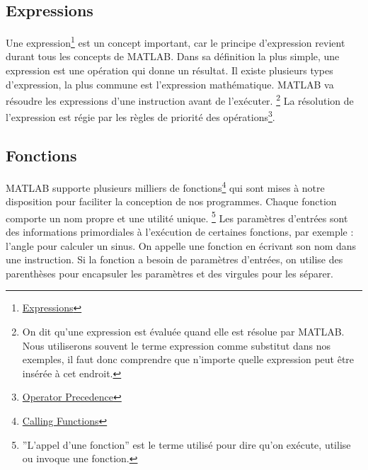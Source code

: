 \documentclass{tufte-handout}
\begin{document}
\subsection{Expressions}
Une expression\footnote{\href{https://www.mathworks.com/help/matlab/learn_matlab/expressions.html}{Expressions}} est un concept important, car le principe d'expression revient durant tous les concepts de MATLAB.
Dans sa définition la plus simple, une expression est une opération qui donne un résultat. Il existe plusieurs types d'expression, la plus commune est l'expression mathématique.
MATLAB va résoudre les expressions d'une instruction avant de l'exécuter.
\footnote{On dit qu'une expression est évaluée quand elle est résolue par MATLAB.
Nous utiliserons souvent le terme expression comme substitut dans nos exemples, il faut donc comprendre que n'importe quelle expression peut être insérée à cet endroit.}
La résolution de l'expression est régie par les règles de priorité des opérations\footnote{\href{https://www.mathworks.com/help/matlab/matlab_prog/operator-precedence.html}{Operator Precedence}}.
\subsection{Fonctions}
MATLAB supporte plusieurs milliers de fonctions\footnote{\href{https://www.mathworks.com/help/matlab/learn_matlab/calling-functions.html}{Calling Functions}} qui sont mises à notre disposition pour faciliter la conception de nos programmes. Chaque fonction comporte un nom propre et une utilité unique.
\footnote{”L'appel d'une fonction” est le terme utilisé pour dire qu'on exécute, utilise ou invoque une fonction.}
Les paramètres d'entrées sont des informations primordiales à l'exécution de certaines fonctions, par exemple : l'angle pour calculer un sinus.
On appelle une fonction en écrivant son nom dans une instruction. Si la fonction a besoin de paramètres d'entrées, on utilise des parenthèses pour encapsuler les paramètres et des virgules pour les séparer.
\end{document}
